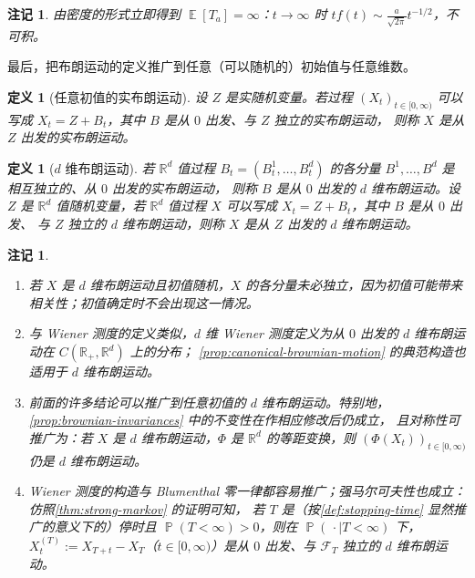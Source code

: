 \documentclass[UTF8,11pt,a4paper,oneside,fontset=fandol]{ctexrep}
\numberwithin{equation}{section}
\theoremstyle{zhthm}
\newtheorem{definition}[theorem]{定义}
\newtheorem{remark}[theorem]{注记}
\newcommand{\R}{\mathbb{R}}
\newcommand{\F}{\mathcal{F}}
\DeclareMathOperator{\Prob}{\mathbb{P}}
\DeclareMathOperator{\E}{\mathbb{E}}
\begin{document}
\begin{remark}
\label{rem:hitting-time-infinite-mean}
由密度的形式立即得到 $\E[T_a]=\infty$：$t\to\infty$ 时 $tf(t)\sim\frac{a}{\sqrt{2\pi}}t^{-1/2}$，不可积。
\end{remark}

最后，把布朗运动的定义推广到任意（可以随机的）初始值与任意维数。

\begin{definition}[任意初值的实布朗运动]
\label{def:brownian-motion-initial}
设 $Z$ 是实随机变量。若过程 $(X_t)_{t\in[0,\infty)}$ 可以写成 $X_t=Z+B_t$，其中 $B$ 是从 $0$ 出发、与 $Z$ 独立的实布朗运动，
则称 $X$ 是从 $Z$ 出发的实布朗运动。
\end{definition}

\begin{definition}[$d$ 维布朗运动]
\label{def:brownian-motion-d}
若 $\R^d$ 值过程 $B_t=(B_t^1,\ldots,B_t^d)$ 的各分量 $B^1,\ldots,B^d$ 是相互独立的、从 $0$ 出发的实布朗运动，
则称 $B$ 是从 $0$ 出发的 $d$ 维布朗运动。设 $Z$ 是 $\R^d$ 值随机变量，若 $\R^d$ 值过程 $X$ 可以写成 $X_t=Z+B_t$，其中 $B$ 是从 $0$ 出发、
与 $Z$ 独立的 $d$ 维布朗运动，则称 $X$ 是从 $Z$ 出发的 $d$ 维布朗运动。
\end{definition}

\begin{remark}
\label{rem:brownian-d-extensions}
\begin{enumerate}
  \item 若 $X$ 是 $d$ 维布朗运动且初值随机，$X$ 的各分量未必独立，因为初值可能带来相关性；初值确定时不会出现这一情况。
  \item 与 Wiener 测度的定义类似，$d$ 维 Wiener 测度定义为从 $0$ 出发的 $d$ 维布朗运动在 $C(\R_+,\R^d)$ 上的分布；
    \cref{prop:canonical-brownian-motion} 的典范构造也适用于 $d$ 维布朗运动。
  \item 前面的许多结论可以推广到任意初值的 $d$ 维布朗运动。特别地，\cref{prop:brownian-invariances} 中的不变性在作相应修改后仍成立，
    且对称性可推广为：若 $X$ 是 $d$ 维布朗运动，$\Phi$ 是 $\R^d$ 的等距变换，则 $(\Phi(X_t))_{t\in[0,\infty)}$ 仍是 $d$ 维布朗运动。
  \item Wiener 测度的构造与 Blumenthal 零一律都容易推广；强马尔可夫性也成立：仿照\cref{thm:strong-markov} 的证明可知，
    若 $T$ 是（按\cref{def:stopping-time} 显然推广的意义下的）停时且 $\Prob(T<\infty)>0$，则在 $\Prob(\,\cdot\mid T<\infty)$ 下，
    $X^{(T)}_t:=X_{T+t}-X_T$（$t\in[0,\infty)$）是从 $0$ 出发、与 $\F_T$ 独立的 $d$ 维布朗运动。
\end{enumerate}
\end{remark}
\end{document}
